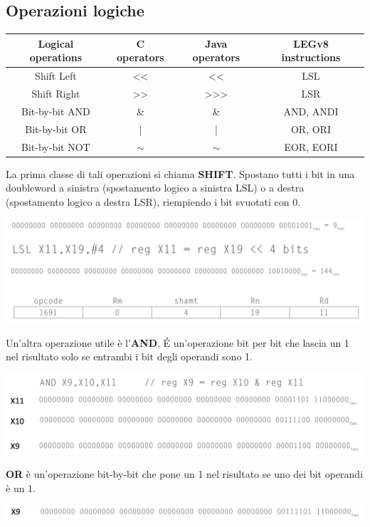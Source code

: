 \documentclass[12pt,a4paper]{article}
\begin{document}
\subsection{Operazioni logiche}
\Sep
\begin{center}
\begin{tabular}{|c|c|c|c|}
\hline
\rowcolor[HTML]{FFC702} 
Logical operations & C operators & Java operators & LEGv8 instructions\\ \hline
Shift Left & << & << & LSL \\ \hline
Shift Right & >> & >>> & LSR \\ \hline
Bit-by-bit AND & \& & \& & AND, ANDI \\ \hline
Bit-by-bit OR & | & | & OR, ORI \\ \hline
Bit-by-bit NOT & $\sim$ & $\sim$ & EOR, EORI \\ \hline
\end{tabular}
\end{center}
La prima classe di tali operazioni si chiama \textbf{SHIFT}. Spostano tutti i bit in una doubleword a sinistra (spostamento logico a sinistra LSL) o a destra (spostamento logico a destra LSR), riempiendo i bit svuotati con 0.\\
\begin{center}
\includegraphics[width=0.7\columnwidth]{img/shift.png}
\end{center}
Un'altra operazione utile è l'\textbf{AND}. \'E un'operazione bit per bit che lascia un 1 nel risultato solo se entrambi i bit degli operandi sono 1.
\begin{center}
\includegraphics[width=0.7\columnwidth]{img/and.png}
\end{center}
\textbf{OR} è un'operazione bit-by-bit che pone un 1 nel risultato se uno dei bit operandi è un 1.
\begin{center}
\includegraphics[width=0.7\columnwidth]{img/or.png}
\end{center}
\end{document}
